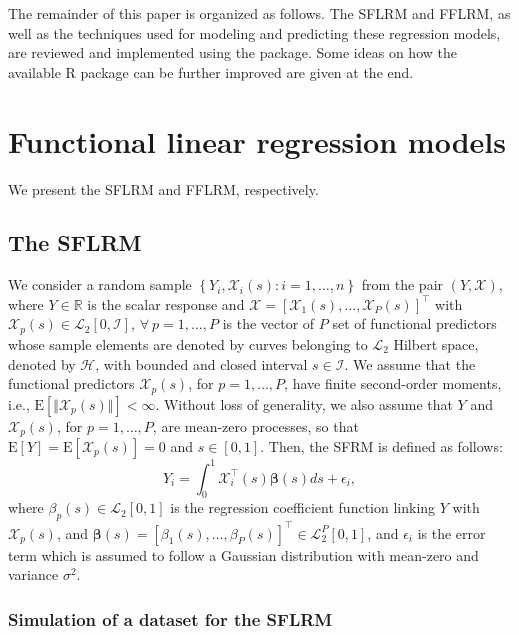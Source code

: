 The remainder of this paper is organized as follows. The SFLRM and FFLRM, as well as the techniques used for modeling and predicting these regression models, are reviewed and implemented using the  package. Some ideas on how the available \textsf{R} package  can be further improved are given at the end.

\section*{Functional linear regression models}

We present the SFLRM and FFLRM, respectively.

\subsection*{The SFLRM}

We consider a random sample $\left\lbrace Y_i, \bm{\mathcal{X}}_{i}(s): i = 1, \ldots, n \right\rbrace$ from the pair $( Y, \bm{\mathcal{X}} )$, where $Y \in \mathbb{R}$ is the scalar response and $\bm{\mathcal{X}} = [\mathcal{X}_1(s), \ldots, \mathcal{X}_P(s)]^\top$ with $\mathcal{X}_p(s) \in \mathcal{L}_2[0,\mathcal{I}]$, $\forall~p = 1, \ldots, P$ is the vector of $P$ set of functional predictors whose sample elements are denoted by curves belonging to $\mathcal{L}_2$ Hilbert space, denoted by $\mathcal{H}$, with bounded and closed interval $s \in \mathcal{I}$. We assume that the functional predictors $\mathcal{X}_p(s)$, for $p = 1, \ldots, P$, have finite second-order moments, i.e., $\text{E}[\Vert \mathcal{X}_p(s) \Vert] < \infty$. Without loss of generality, we also assume that $Y$ and $\mathcal{X}_p(s)$, for $p = 1, \ldots, P$, are mean-zero processes, so that $\text{E}[Y] = \text{E}[\mathcal{X}_p(s)] = 0$ and $s \in [0,1]$. Then, the SFRM is defined as follows:
\begin{equation}\label{eq:sof}
Y_i = \int_0^1 \bm{\mathcal{X}}_i^\top(s) \bm{\beta}(s) ds + \epsilon_i,
\end{equation}
where $\beta_p(s) \in \mathcal{L}_2[0,1]$ is the regression coefficient function linking $Y$ with $\mathcal{X}_p(s)$, and $\bm{\beta}(s) = [ \beta_1(s), \ldots, \beta_P(s) ]^\top \in \mathcal{L}_2^P[0,1]$, and $\epsilon_i$ is the error term which is assumed to follow a Gaussian distribution with mean-zero and variance $\sigma^2$.

\subsubsection*{Simulation of a dataset for the SFLRM}

